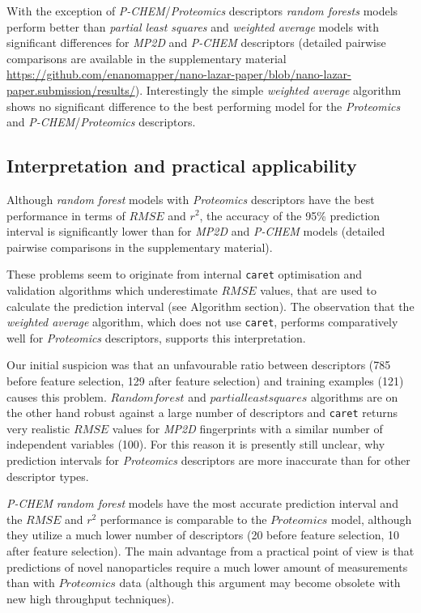 \documentclass[utf8]{frontiersHLTH} %
\begin{document}
With the exception of \emph{P-CHEM}/\emph{Proteomics} descriptors
\emph{random forests} models perform better than \emph{partial least
squares} and \emph{weighted average} models with significant differences
for \emph{MP2D} and \emph{P-CHEM} descriptors (detailed pairwise
comparisons are available in the supplementary material
\url{https://github.com/enanomapper/nano-lazar-paper/blob/nano-lazar-paper.submission/results/}).
Interestingly the simple \emph{weighted average} algorithm shows no
significant difference to the best performing model for the
\emph{Proteomics} and \emph{P-CHEM}/\emph{Proteomics} descriptors.

\subsection{Interpretation and practical
applicability}\label{interpretation-and-practical-applicability}

Although \emph{random forest} models with \emph{Proteomics} descriptors
have the best performance in terms of \(RMSE\) and \(r^2\), the accuracy
of the 95\% prediction interval is significantly lower than for
\emph{MP2D} and \emph{P-CHEM} models (detailed pairwise comparisons in
the supplementary material).

These problems seem to originate from internal \texttt{caret}
optimisation and validation algorithms which underestimate \(RMSE\)
values, that are used to calculate the prediction interval (see
Algorithm section). The observation that the \emph{weighted average}
algorithm, which does not use \texttt{caret}, performs comparatively
well for \emph{Proteomics} descriptors, supports this interpretation.

Our initial suspicion was that an unfavourable ratio between descriptors
(785 before feature selection, 129 after feature selection) and training
examples (121) causes this problem. \(Random forest\) and
\(partial least squares\) algorithms are on the other hand robust
against a large number of descriptors and \texttt{caret} returns very
realistic \(RMSE\) values for \emph{MP2D} fingerprints with a similar
number of independent variables (100). For this reason it is presently
still unclear, why prediction intervals for \emph{Proteomics}
descriptors are more inaccurate than for other descriptor types.

\emph{P-CHEM} \emph{random forest} models have the most accurate
prediction interval and the \(RMSE\) and \(r^2\) performance is
comparable to the \(Proteomics\) model, although they utilize a much
lower number of descriptors (20 before feature selection, 10 after
feature selection). The main advantage from a practical point of view is
that predictions of novel nanoparticles require a much lower amount of
measurements than with \(Proteomics\) data (although this argument may
become obsolete with new high throughput techniques).
\end{document}
